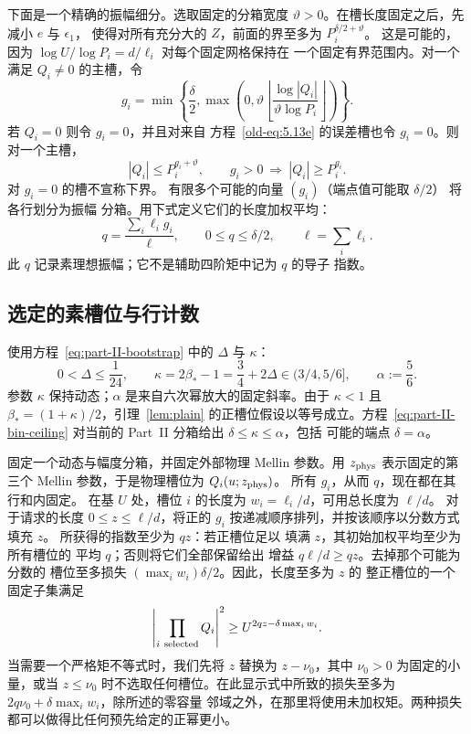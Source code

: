 \documentclass[11pt,a4paper]{article}
\numberwithin{equation}{section}
\numberwithin{figure}{section}
\theoremstyle{definition}
\theoremstyle{remark}
\begin{document}
下面是一个精确的振幅细分。选取固定的分箱宽度
\(\vartheta>0\)。在槽长度固定之后，先减小 \(e\) 与 \(\epsilon_1\)，
使得对所有充分大的 \(Z\)，前面的界至多为
\(P_i^{\delta/2+\vartheta}\)。
这是可能的，因为
\(\log U/\log P_i=d/\ell_i\) 对每个固定网格保持在
一个固定有界范围内。对一个满足 \(Q_i\ne0\) 的主槽，令
\[
 g_i=\min\left\{\frac{\delta}{2},
   \max\left(0,\vartheta
     \left\lfloor\frac{\log|Q_i|}{\vartheta\log P_i}\right\rfloor
   \right)\right\}.
\]
若 \(Q_i=0\) 则令 \(g_i=0\)，并且对来自
方程~\eqref{old-eq:5.13e} 的误差槽也令 \(g_i=0\)。则对一个主槽，
\[
 |Q_i|\le P_i^{g_i+\vartheta},\qquad
 g_i>0\ \Longrightarrow\ |Q_i|\ge P_i^{g_i}.
\]
对 \(g_i=0\) 的槽不宣称下界。
有限多个可能的向量 \((g_i)\)（端点值可能取 \(\delta/2\)）
将各行划分为振幅
分箱。用下式定义它们的长度加权平均：
\begin{equation}
 q=\frac{\sum_i\ell_i g_i}{\ell},\qquad
 0\le q\le\delta/2,\qquad \ell=\sum_i\ell_i.
 \label{old-eq:6.6}
\end{equation}
此 \(q\) 记录素理想振幅；它不是辅助四阶矩中记为 \(q\) 的导子
指数。

\subsection{选定的素槽位与行计数}\label{sec:selection}

使用方程~\eqref{eq:part-II-bootstrap} 中的 \(\Delta\) 与 \(\kappa\)：
\[
 0<\Delta\le\frac1{24},\qquad
 \kappa=2\beta_*-1=\frac34+2\Delta\in(3/4,5/6],\qquad
 \alpha:=\frac56.
\]
参数 \(\kappa\) 保持动态；\(\alpha\) 是来自六次幂放大的固定斜率。由于 \(\kappa<1\) 且
\(\beta_*=(1+\kappa)/2\)，引理~\ref{lem:plain} 的正槽位假设以等号成立。方程~\eqref{eq:part-II-bin-ceiling}
对当前的 Part~II 分箱给出 \(\delta\le\kappa\le\alpha\)，包括
可能的端点 \(\delta=\alpha\)。

固定一个动态与幅度分箱，并固定外部物理
Mellin 参数。用 \(z_{\rm phys}\) 表示固定的第三个 Mellin
参数，于是物理槽位为 \(Q_i(u;z_{\rm phys})\)。
所有 \(g_i\)，从而 \(q\)，现在都在其行和内固定。
在基 \(U\) 处，槽位 \(i\) 的长度为
\(w_i=\ell_i/d\)，可用总长度为 \(\ell/d\)。
对于请求的长度 \(0\le z\le\ell/d\)，将正的
\(g_i\) 按递减顺序排列，并按该顺序以分数方式填充 \(z\)。
所获得的指数至少为 \(qz\)：若正槽位足以
填满 \(z\)，其初始加权平均至少为所有槽位的
平均 \(q\)；否则将它们全部保留给出
增益 \(q\ell/d\ge qz\)。去掉那个可能为分数的
槽位至多损失 \((\max_i w_i)\delta/2\)。因此，长度至多为 \(z\) 的
整正槽位的一个固定子集满足
\[
 \left|\prod_{i\ {\rm selected}}Q_i\right|^2
 \ge U^{2qz-\delta\max_iw_i}.
\]
当需要一个严格矩不等式时，我们先将 \(z\)
替换为 \(z-\nu_0\)，其中 \(\nu_0>0\) 为固定的小量，或当
\(z\le\nu_0\) 时不选取任何槽位。在此显示式中所致的损失至多为
\(2q\nu_0+\delta\max_iw_i\)，除所述的零容量
邻域之外，在那里将使用未加权矩。两种损失
都可以做得比任何预先给定的正幂更小。
\end{document}
